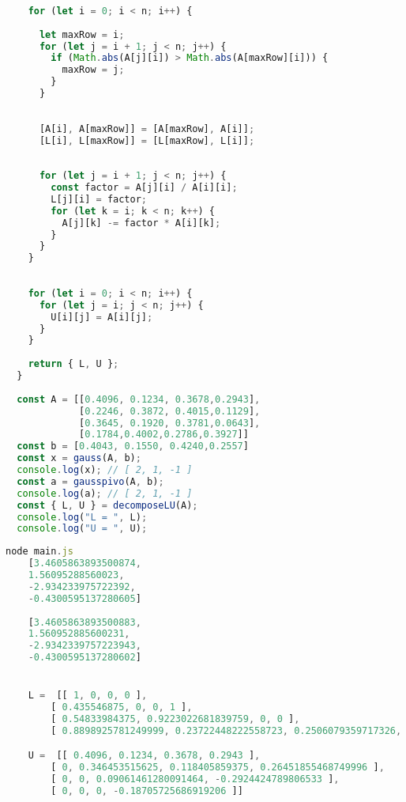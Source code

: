 \documentclass{article}
\begin{document}
\begin{lstlisting}[language=JavaScript, caption=métodos de eliminação de Gauss e Gauss com pivotamento.]
    
    for (let i = 0; i < n; i++) {
      
      let maxRow = i;
      for (let j = i + 1; j < n; j++) {
        if (Math.abs(A[j][i]) > Math.abs(A[maxRow][i])) {
          maxRow = j;
        }
      }
  
      
      [A[i], A[maxRow]] = [A[maxRow], A[i]];
      [L[i], L[maxRow]] = [L[maxRow], L[i]];
  
      
      for (let j = i + 1; j < n; j++) {
        const factor = A[j][i] / A[i][i];
        L[j][i] = factor;
        for (let k = i; k < n; k++) {
          A[j][k] -= factor * A[i][k];
        }
      }
    }
  
    
    for (let i = 0; i < n; i++) {
      for (let j = i; j < n; j++) {
        U[i][j] = A[i][j];
      }
    }
  
    return { L, U };
  }
  
  const A = [[0.4096, 0.1234, 0.3678,0.2943],
             [0.2246, 0.3872, 0.4015,0.1129],
             [0.3645, 0.1920, 0.3781,0.0643],
             [0.1784,0.4002,0.2786,0.3927]]
  const b = [0.4043, 0.1550, 0.4240,0.2557]
  const x = gauss(A, b);
  console.log(x); // [ 2, 1, -1 ]
  const a = gausspivo(A, b);
  console.log(a); // [ 2, 1, -1 ]
  const { L, U } = decomposeLU(A);
  console.log("L = ", L);
  console.log("U = ", U);
  \end{lstlisting}
  \begin{lstlisting}[language=JavaScript, caption=Execussão do codido]
    node main.js
    [3.4605863893500874,
    1.56095288560023,  
    -2.934233975722392,
    -0.4300595137280605]
    
    [3.4605863893500883, 
    1.560952885600231,  
    -2.9342339757223943,
    -0.4300595137280602]


    L =  [[ 1, 0, 0, 0 ],
        [ 0.435546875, 0, 0, 1 ],
        [ 0.54833984375, 0.9223022681839759, 0, 0 ],
        [ 0.8898925781249999, 0.23722448222558723, 0.2506079359717326, 0 ]]

    U =  [[ 0.4096, 0.1234, 0.3678, 0.2943 ],
        [ 0, 0.346453515625, 0.118405859375, 0.26451855468749996 ],
        [ 0, 0, 0.09061461280091464, -0.2924424789806533 ],
        [ 0, 0, 0, -0.18705725686919206 ]]
  \end{lstlisting}
   

  
\end{document}
